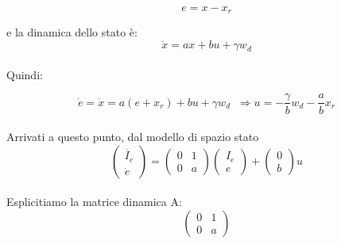 \documentclass[a4paper,13pt]{article}
\begin{document}
\begin{equation*}
	e=x-x_{r}          %
\end{equation*}
	
	e la dinamica dello stato è:
\begin{equation*}
	\dot{x}=ax+bu+\gamma w_{d}    %
\end{equation*} \\
	
	Quindi:

\begin{equation*}
	\dot{e}=\dot{x}=a(e+x_{r})+bu+\gamma w_{d}\,\,\:           %
	\Rightarrow u=-\frac{\gamma}{b} w_{d}-\frac{a}{b} x_{r}
\end{equation*} \\

	Arrivati a questo punto, dal modello di spazio stato\\
\begin{equation*}	
\begin{pmatrix}
	
	\dot{I_{e}} \\ \dot{e}
	
\end{pmatrix} =         %
\begin{pmatrix}

	0&1\\0&a

\end{pmatrix}
\begin{pmatrix}

	I_{e}\\e

\end{pmatrix} +           %
\begin{pmatrix}

	0\\b

\end{pmatrix} u
\end{equation*} \\

	Esplicitiamo la matrice dinamica A:        %
\begin{equation*}
\begin{pmatrix}

	0&1\\0&a

\end{pmatrix}
\end{equation*} \\
\end{document}
